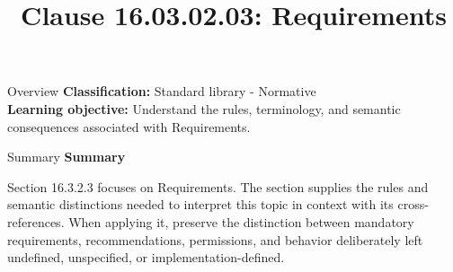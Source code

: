 \documentclass[10pt,letterpaper]{article}
\title{Clause 16.03.02.03: Requirements}
\author{}
\date{}
\begin{document}
\maketitle
\begin{CornellOverviewBox}{Overview}
\textbf{Classification:} Standard library - Normative\\[2pt]
\textbf{Learning objective:} Understand the rules, terminology, and semantic consequences associated with Requirements.
\end{CornellOverviewBox}\begin{CornellSummaryBox}{Summary}
{\sffamily\bfseries\color{Accent} Summary}\par\vspace{3pt}Section 16.3.2.3 focuses on Requirements. The section supplies the rules and semantic distinctions needed to interpret this topic in context with its cross-references. When applying it, preserve the distinction between mandatory requirements, recommendations, permissions, and behavior deliberately left undefined, unspecified, or implementation-defined.
\end{CornellSummaryBox}
\end{document}
